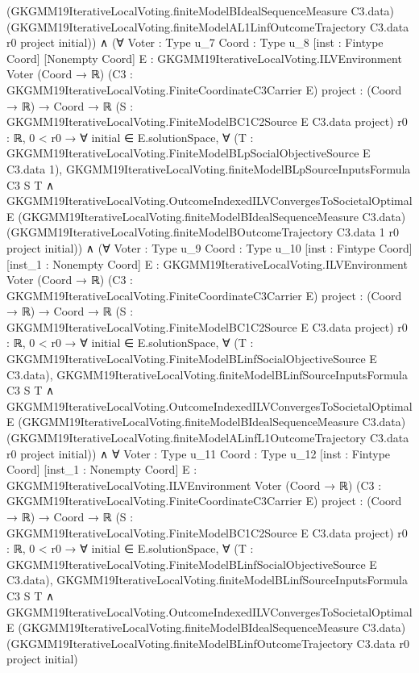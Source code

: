 \documentclass[10pt]{article}
\begin{document}
\begin{ReviewVerbatim}
                  (GKGMM19IterativeLocalVoting.finiteModelBIdealSequenceMeasure C3.data)
                  (GKGMM19IterativeLocalVoting.finiteModelAL1LinfOutcomeTrajectory C3.data r0 project initial)) ∧
      (∀ {Voter : Type u_7} {Coord : Type u_8} [inst : Fintype Coord] [Nonempty Coord]
          {E : GKGMM19IterativeLocalVoting.ILVEnvironment Voter (Coord → ℝ)}
          (C3 : GKGMM19IterativeLocalVoting.FiniteCoordinateC3Carrier E) {project : (Coord → ℝ) → Coord → ℝ}
          (S : GKGMM19IterativeLocalVoting.FiniteModelBC1C2Source E C3.data project) {r0 : ℝ},
          0 < r0 →
            ∀ initial ∈ E.solutionSpace,
              ∀ (T : GKGMM19IterativeLocalVoting.FiniteModelBLpSocialObjectiveSource E C3.data 1),
                GKGMM19IterativeLocalVoting.finiteModelBLpSourceInputsFormula C3 S T ∧
                  GKGMM19IterativeLocalVoting.OutcomeIndexedILVConvergesToSocietalOptimal E
                    (GKGMM19IterativeLocalVoting.finiteModelBIdealSequenceMeasure C3.data)
                    (GKGMM19IterativeLocalVoting.finiteModelBOutcomeTrajectory C3.data 1 r0 project initial)) ∧
        (∀ {Voter : Type u_9} {Coord : Type u_10} [inst : Fintype Coord] [inst_1 : Nonempty Coord]
            {E : GKGMM19IterativeLocalVoting.ILVEnvironment Voter (Coord → ℝ)}
            (C3 : GKGMM19IterativeLocalVoting.FiniteCoordinateC3Carrier E) {project : (Coord → ℝ) → Coord → ℝ}
            (S : GKGMM19IterativeLocalVoting.FiniteModelBC1C2Source E C3.data project) {r0 : ℝ},
            0 < r0 →
              ∀ initial ∈ E.solutionSpace,
                ∀ (T : GKGMM19IterativeLocalVoting.FiniteModelBLinfSocialObjectiveSource E C3.data),
                  GKGMM19IterativeLocalVoting.finiteModelBLinfSourceInputsFormula C3 S T ∧
                    GKGMM19IterativeLocalVoting.OutcomeIndexedILVConvergesToSocietalOptimal E
                      (GKGMM19IterativeLocalVoting.finiteModelBIdealSequenceMeasure C3.data)
                      (GKGMM19IterativeLocalVoting.finiteModelALinfL1OutcomeTrajectory C3.data r0 project initial)) ∧
          ∀ {Voter : Type u_11} {Coord : Type u_12} [inst : Fintype Coord] [inst_1 : Nonempty Coord]
            {E : GKGMM19IterativeLocalVoting.ILVEnvironment Voter (Coord → ℝ)}
            (C3 : GKGMM19IterativeLocalVoting.FiniteCoordinateC3Carrier E) {project : (Coord → ℝ) → Coord → ℝ}
            (S : GKGMM19IterativeLocalVoting.FiniteModelBC1C2Source E C3.data project) {r0 : ℝ},
            0 < r0 →
              ∀ initial ∈ E.solutionSpace,
                ∀ (T : GKGMM19IterativeLocalVoting.FiniteModelBLinfSocialObjectiveSource E C3.data),
                  GKGMM19IterativeLocalVoting.finiteModelBLinfSourceInputsFormula C3 S T ∧
                    GKGMM19IterativeLocalVoting.OutcomeIndexedILVConvergesToSocietalOptimal E
                      (GKGMM19IterativeLocalVoting.finiteModelBIdealSequenceMeasure C3.data)
                      (GKGMM19IterativeLocalVoting.finiteModelBLinfOutcomeTrajectory C3.data r0 project initial)
\end{ReviewVerbatim}
\end{document}
